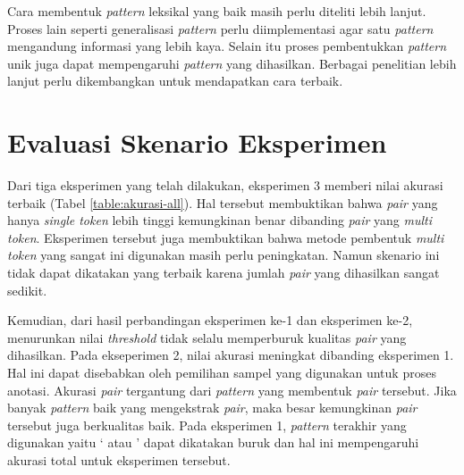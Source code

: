 \begin{itemize}
\end{itemize}

Cara membentuk \textit{pattern} leksikal yang baik masih perlu diteliti lebih lanjut. Proses lain seperti generalisasi \textit{pattern} perlu diimplementasi agar satu \textit{pattern} mengandung informasi yang lebih kaya. Selain itu proses pembentukkan \textit{pattern} unik juga dapat mempengaruhi \textit{pattern} yang dihasilkan. Berbagai penelitian lebih lanjut perlu dikembangkan untuk mendapatkan cara terbaik.

\section{Evaluasi Skenario Eksperimen}
Dari tiga eksperimen yang telah dilakukan, eksperimen 3 memberi nilai akurasi terbaik (Tabel \ref{table:akurasi-all}). Hal tersebut membuktikan bahwa \textit{pair} yang hanya \textit{single token} lebih tinggi kemungkinan benar dibanding \textit{pair} yang \textit{multi token}. Eksperimen tersebut juga membuktikan bahwa metode pembentuk \textit{multi token} yang sangat ini digunakan masih perlu peningkatan. Namun skenario ini tidak dapat dikatakan yang terbaik karena jumlah \textit{pair} yang dihasilkan sangat sedikit.

Kemudian, dari hasil perbandingan eksperimen ke-1 dan eksperimen ke-2, menurunkan nilai \textit{threshold} tidak selalu memperburuk kualitas \textit{pair} yang dihasilkan. Pada ekseperimen 2, nilai akurasi meningkat dibanding eksperimen 1. Hal ini dapat disebabkan oleh pemilihan sampel yang digunakan untuk proses anotasi. Akurasi \textit{pair} tergantung dari \textit{pattern} yang membentuk \textit{pair} tersebut. Jika banyak \textit{pattern} baik yang mengekstrak \textit{pair}, maka besar kemungkinan \textit{pair} tersebut juga berkualitas baik. Pada eksperimen 1, \textit{pattern} terakhir yang digunakan yaitu `{\tagHypernym} atau {\tagHyponym}' dapat dikatakan buruk dan hal ini mempengaruhi akurasi total untuk eksperimen tersebut.


